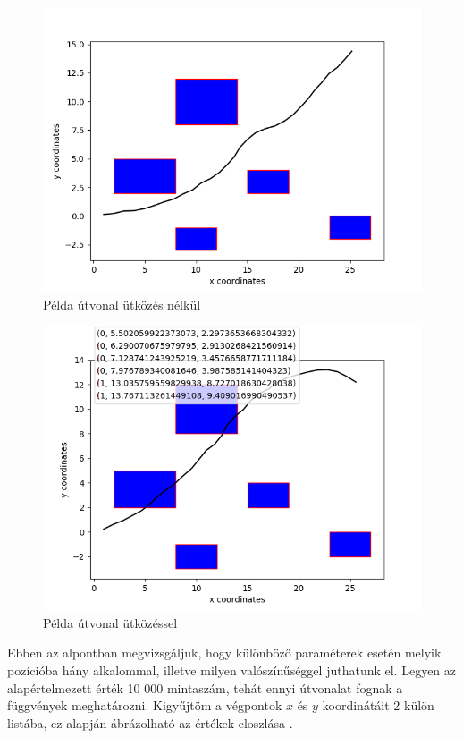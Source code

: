 \begin{figure}[h!]
\centering
\includegraphics[scale=0.75]{images/example_nocollision.png}
\caption{Példa útvonal ütközés nélkül}
\label{fig:example_nocollision}
\end{figure}

\begin{figure}[h!]
\centering
\includegraphics[scale=0.75]{images/example_collision.png}
\caption{Példa útvonal ütközéssel}
\label{fig:example_collision}
\end{figure}

\newpage


Ebben az alpontban megvizsgáljuk, hogy különböző paraméterek esetén melyik pozícióba hány alkalommal, illetve milyen valószínűséggel juthatunk el. Legyen az alapértelmezett érték 10 000 mintaszám, tehát ennyi útvonalat fognak a függvények meghatározni. Kigyűjtöm a végpontok $ x $ és $ y $ koordinátáit 2 külön listába, ez alapján ábrázolható az értékek eloszlása \cite{2DHistogram}.

